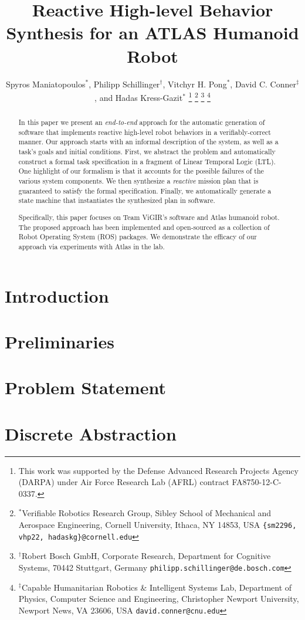 \documentclass[letterpaper, 10 pt, conference]{ieeeconf}	%
\title{\LARGE \bf
	Reactive High-level Behavior Synthesis for an ATLAS Humanoid Robot
}
\author{Spyros Maniatopoulos$^{*}$, Philipp Schillinger$^{\dagger}$, Vitchyr H. Pong$^{*}$, David C. Conner$^{\ddagger}$, and Hadas Kress-Gazit$^{*}$%
\thanks{This work was supported by the Defense Advanced Research Projects Agency (DARPA) under Air Force Research Lab (AFRL) contract FA8750-12-C-0337.}
\thanks{$^{*}$Verifiable Robotics Research Group, Sibley School of Mechanical and Aerospace Engineering, Cornell University, Ithaca, NY 14853, USA {\tt \{sm2296, vhp22, hadaskg\}\nolinkurl{@cornell.edu}}}
\thanks{$^{\dagger}$Robert Bosch GmbH, Corporate Research, Department for Cognitive Systems, 70442 Stuttgart, Germany {\tt philipp.schillinger\nolinkurl{@de.bosch.com}}}
\thanks{$^{\ddagger}$Capable Humanitarian Robotics \& Intelligent Systems Lab, Department of Physics, Computer Science and Engineering, Christopher Newport University, Newport News, VA 23606, USA {\tt david.conner\nolinkurl{@cnu.edu}}}
}%
\begin{document}
%
\maketitle
\thispagestyle{empty}
\pagestyle{empty}
%
\begin{abstract}
In this paper we present an \emph{end-to-end} approach for the automatic generation of software %
 that implements reactive high-level robot behaviors in a verifiably-correct manner.
Our approach starts with an informal description of the system, as well as a task's goals and initial conditions.
First, we abstract the problem and automatically construct a formal task specification in a fragment of Linear Temporal Logic (\textsc{LTL}).
One highlight of our formalism is that it accounts for the possible failures of the various system components.
We then synthesize a \emph{reactive} mission plan that is guaranteed to satisfy the formal specification.
Finally, we automatically generate a state machine that instantiates the synthesized plan in software.

Specifically, this paper focuses on Team ViGIR's software and Atlas humanoid robot.
The proposed approach has been implemented and open-sourced as a collection of Robot Operating System (ROS) packages.
We demonstrate the efficacy of our approach via experiments with Atlas in the lab.
\end{abstract}
%
%
\newpage
%
%
\section{Introduction}\label{S:intro}

%
\section{Preliminaries}\label{S:prelim}

%
\section{Problem Statement}\label{S:problem}

%
\section{Discrete Abstraction}\label{S:abstraction}

%
\end{document}
